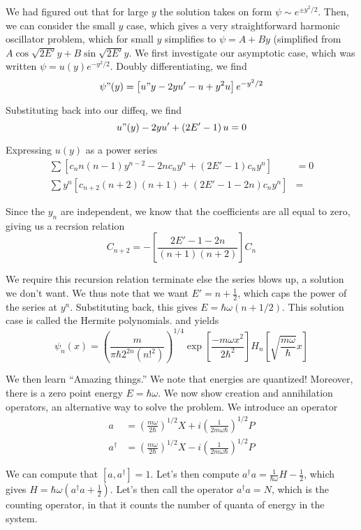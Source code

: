 \documentclass[10pt]{report}
\begin{document}
We had figured out that for large $y$ the solution takes on form $\psi \sim e^{\pm y^2/2}$. Then, we can consider the small $y$ case, which gives a very straightforward harmonic oscillator problem, which for small $y$ simplifies to $\psi = A+By$ (simplified from $A\cos \sqrt{2E'}y + B\sin \sqrt{2E'}y$. We first investigate our asymptotic case, which was written $\psi = u(y)e^{-y^2/2}$. Doubly differentiating, we find
$$\psi"(y) = \left[ u"y - 2yu' - u + y^2u \right] e^{-y^2/2}$$

Substituting back into our diffeq, we find 
$$u"(y) - 2yu' + \left( 2E'-1 \right)u = 0$$

Expressing $u(y)$ as a power series
\begin{align}
	\sum \left[ c_nn(n-1)y^{n-2} - 2nc_ny^n + \left( 2E'-1 \right)c_ny^n \right] &= 0\\
	\sum y^n \left[ c_{n+2}(n+2)(n+1)+ \left( 2E'-1 -2n\right)c_ny^n \right] &=
\end{align}

Since the $y_n$ are independent, we know that the coefficients are all equal to zero, giving us a recrsion relation
$$C_{n+2} = -\left[ \frac{2E'-1-2n}{(n+1)(n+2)} \right]C_n$$

We require this recursion relation terminate else the series blows up, a solution we don't want. We thus note that we want $E' = n+\frac{1}{2}$, which caps the power of the series at $y^n$. Substituting back, this gives $E=\hbar\omega\left( n+1/2 \right)$. This solution case is called the Hermite polynomials. and yields
$$\psi_n(x) = \left( \frac{m}{\pi\hbar 2^{2n}(n!^2)} \right)^{1/4} \exp \left[ \frac{-m\omega x^2}{2\hbar^2} \right]H_n\left[ \sqrt{\frac{m\omega}{\hbar}}x \right]$$

We then learn ``Amazing things.'' We note that energies are quantized! Moreover, there is a zero point energy $E=\hbar\omega$. We now show creation and annihilation operators, an alternative way to solve the problem. We introduce an operator
\begin{align}
	a&=\left( \frac{m\omega}{2\hbar} \right)^{1/2}X + i\left( \frac{1}{2m\omega\hbar} \right)^{1/2}P\\
	a^\dagger&=\left( \frac{m\omega}{2\hbar} \right)^{1/2}X - i\left( \frac{1}{2m\omega\hbar} \right)^{1/2}P
\end{align}

We can compute that $[a,a^\dagger] = 1$. Let's then compute $a^\dagger a = \frac{1}{\hbar\omega}H-\frac{1}{2}$, which gives $H=\hbar\omega\left( a^\dagger a + \frac{1}{2} \right)$. Let's then call the operator $a^\dagger a = N$, which is the counting operator, in that it counts the number of quanta of energy in the system.
\end{document}
